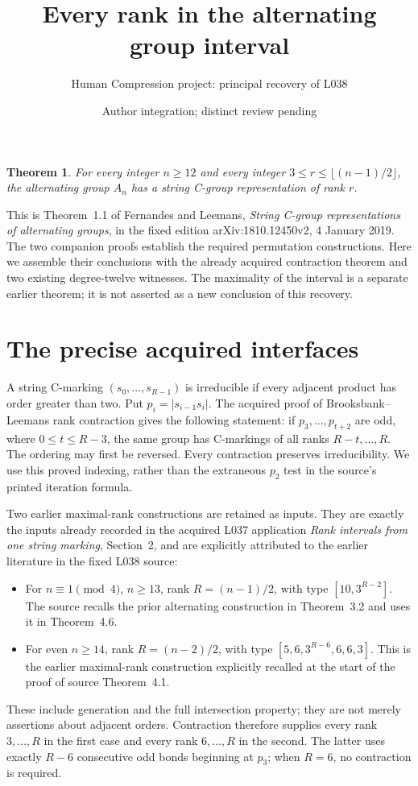 \documentclass[11pt]{article}
\title{Every rank in the alternating group interval}
\author{Human Compression project: principal recovery of L038}
\date{Author integration; distinct review pending}
\newtheorem{theorem}{Theorem}
\begin{document}
\maketitle

\begin{theorem}
For every integer $n\ge12$ and every integer
$3\le r\le\lfloor(n-1)/2\rfloor$, the alternating group $A_n$
has a string C-group representation of rank $r$.
\end{theorem}

This is Theorem~1.1 of Fernandes and Leemans,
\emph{String C-group representations of alternating groups},
in the fixed edition arXiv:1810.12450v2, 4 January 2019. The two
companion proofs establish the required permutation constructions.
Here we assemble their conclusions with the already acquired
contraction theorem and two existing degree-twelve witnesses.
The maximality of the interval is a separate earlier theorem;
it is not asserted as a new conclusion of this recovery.

\section{The precise acquired interfaces}
A string C-marking $(s_0,\ldots,s_{R-1})$ is irreducible if every
adjacent product has order greater than two. Put
$p_i=|s_{i-1}s_i|$. The acquired proof of Brooksbank--Leemans
rank contraction gives the following statement: if
$p_3,\ldots,p_{t+2}$ are odd, where $0\le t\le R-3$, the same
group has C-markings of all ranks $R-t,\ldots,R$. The ordering
may first be reversed. Every contraction preserves irreducibility.
We use this proved indexing, rather than the extraneous $p_2$
test in the source's printed iteration formula.

Two earlier maximal-rank constructions are retained as inputs.
They are exactly the inputs already recorded in the acquired
L037 application \emph{Rank intervals from one string marking},
Section~2, and are explicitly attributed to the earlier literature
in the fixed L038 source:
\begin{itemize}
\item For $n\equiv1\pmod4$, $n\ge13$, rank $R=(n-1)/2$,
with type $[10,3^{R-2}]$. The source recalls the prior alternating
construction in Theorem~3.2 and uses it in Theorem~4.6.
\item For even $n\ge14$, rank $R=(n-2)/2$, with type
$[5,6,3^{R-6},6,6,3]$. This is the earlier maximal-rank
construction explicitly recalled at the start of the proof of
source Theorem~4.1.
\end{itemize}
These include generation and the full intersection property;
they are not merely assertions about adjacent orders. Contraction
therefore supplies every rank $3,\ldots,R$ in the first case
and every rank $6,\ldots,R$ in the second. The latter uses
exactly $R-6$ consecutive odd bonds beginning at $p_3$; when
$R=6$, no contraction is required.
\end{document}
